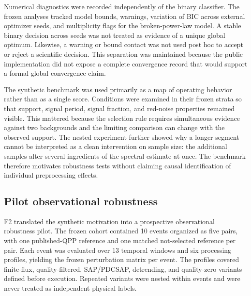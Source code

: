 \documentclass[manuscript,linenumbers]{aastex702}
\begin{document}
Numerical diagnostics were recorded independently of the binary classifier. The frozen analyses tracked model bounds, warnings, variation of BIC across external optimizer seeds, and multiplicity flags for the broken-power-law model. A stable binary decision across seeds was not treated as evidence of a unique global optimum. Likewise, a warning or bound contact was not used post hoc to accept or reject a scientific decision. This separation was maintained because the public implementation did not expose a complete convergence record that would support a formal global-convergence claim.

The synthetic benchmark was used primarily as a map of operating behavior rather than as a single score. Conditions were examined in their frozen strata so that support, signal period, signal fraction, and red-noise properties remained visible. This mattered because the selection rule requires simultaneous evidence against two backgrounds and the limiting comparison can change with the observed support. The nested experiment further showed why a longer segment cannot be interpreted as a clean intervention on sample size: the additional samples alter several ingredients of the spectral estimate at once. The benchmark therefore motivates robustness tests without claiming causal identification of individual preprocessing effects.

\subsection{Pilot observational robustness}
F2 translated the synthetic motivation into a prospective observational robustness pilot. The frozen cohort contained 10 events organized as five pairs, with one published-QPP reference and one matched not-selected reference per pair. Each event was evaluated over 13 temporal windows and six processing profiles, yielding the frozen perturbation matrix per event. The profiles covered finite-flux, quality-filtered, SAP/PDCSAP, detrending, and quality-zero variants defined before execution. Repeated variants were nested within events and were never treated as independent physical labels.
\end{document}

